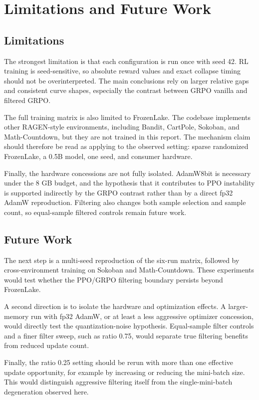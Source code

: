 \section{Limitations and Future Work}
\label{sec:discussion}

\subsection{Limitations}

The strongest limitation is that each configuration is run once with seed 42. RL training is seed-sensitive, so absolute reward values and exact collapse timing should not be overinterpreted. The main conclusions rely on larger relative gaps and consistent curve shapes, especially the contrast between GRPO vanilla and filtered GRPO.

The full training matrix is also limited to FrozenLake. The codebase implements other RAGEN-style environments, including Bandit, CartPole, Sokoban, and Math-Countdown, but they are not trained in this report. The mechanism claim should therefore be read as applying to the observed setting: sparse randomized FrozenLake, a 0.5B model, one seed, and consumer hardware.

Finally, the hardware concessions are not fully isolated. AdamW8bit is necessary under the 8 GB budget, and the hypothesis that it contributes to PPO instability is supported indirectly by the GRPO contrast rather than by a direct fp32 AdamW reproduction. Filtering also changes both sample selection and sample count, so equal-sample filtered controls remain future work.

\subsection{Future Work}

The next step is a multi-seed reproduction of the six-run matrix, followed by cross-environment training on Sokoban and Math-Countdown. These experiments would test whether the PPO/GRPO filtering boundary persists beyond FrozenLake.

A second direction is to isolate the hardware and optimization effects. A larger-memory run with fp32 AdamW, or at least a less aggressive optimizer concession, would directly test the quantization-noise hypothesis. Equal-sample filter controls and a finer filter sweep, such as ratio 0.75, would separate true filtering benefits from reduced update count.

Finally, the ratio 0.25 setting should be rerun with more than one effective update opportunity, for example by increasing  or reducing the mini-batch size. This would distinguish aggressive filtering itself from the single-mini-batch degeneration observed here.
